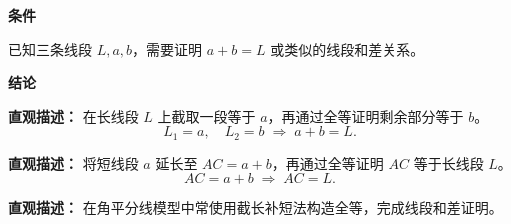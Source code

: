 \begin{statementbox}
	\textbf{\textcolor{CStatement}{条件}}
	\begin{description}[style=nextline, leftmargin=2.8em, labelsep=0.5em, itemsep=0.35em]
		\item[\textbf{\textcolor{CStatement}{条件一（线段和差待证）：}}]
			已知三条线段 $L,a,b$，需要证明 $a+b=L$ 或类似的线段和差关系。
	\end{description}
	\textbf{\textcolor{CStatement}{结论}}
	\begin{description}[style=nextline, leftmargin=2.8em, labelsep=0.5em, itemsep=0.45em]
		\item[\textbf{\textcolor{CStatement}{结论一（截长法）：}}]
			\textbf{\textcolor{CStatement}{直观描述：}}
			在长线段 $L$ 上截取一段等于 $a$，再通过全等证明剩余部分等于 $b$。
			\[
				L_1 = a,\quad L_2 = b \;\Longrightarrow\; a+b = L.
			\]
		\item[\textbf{\textcolor{CStatement}{结论二（补短法）：}}]
			\textbf{\textcolor{CStatement}{直观描述：}}
			将短线段 $a$ 延长至 $AC=a+b$，再通过全等证明 $AC$ 等于长线段 $L$。
			\[
				AC = a+b \;\Longrightarrow\; AC = L.
			\]
		\item[\textbf{\textcolor{CStatement}{推广结论（角平分线模型）：}}]
			\textbf{\textcolor{CStatement}{直观描述：}}
			在角平分线模型中常使用截长补短法构造全等，完成线段和差证明。
	\end{description}

\end{statementbox}
